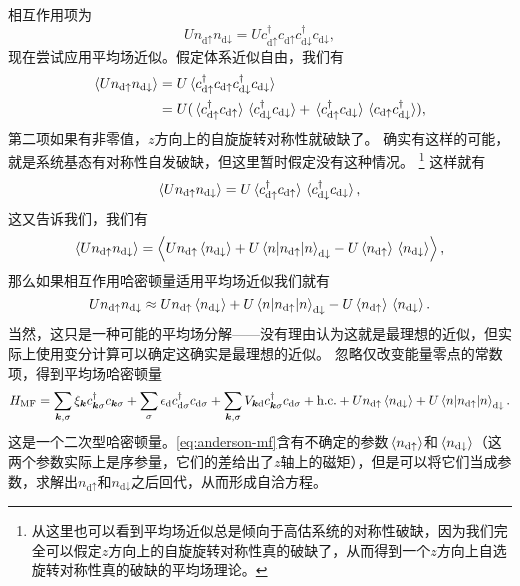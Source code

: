 相互作用项为
\[
    U {n}_{\text{d} \uparrow} {n}_{\text{d} \downarrow} = U {c}_{\text{d} \uparrow}^\dagger {c}_{\text{d} \uparrow} {c}^\dagger_{\text{d} \downarrow} {c}_{\text{d} \downarrow},
\]
现在尝试应用平均场近似。假定体系近似自由，我们有
\[
    \begin{aligned}
        \expval{U {n}_{\text{d} \uparrow} {n}_{\text{d} \downarrow}} &= U \expval*{{c}_{\text{d} \uparrow}^\dagger {c}_{\text{d} \uparrow} {c}^\dagger_{\text{d} \downarrow} {c}_{\text{d} \downarrow}} \\
        &= U ( \expval*{{c}_{\text{d} \uparrow}^\dagger {c}_{\text{d} \uparrow}} \expval*{{c}_{\text{d} \downarrow}^\dagger {c}_{\text{d} \downarrow}} + \expval*{{c}_{\text{d} \uparrow}^\dagger {c}_{\text{d} \downarrow}} \expval*{{c}_{\text{d} \uparrow} {c}^\dagger_{\text{d} \downarrow}} ),
    \end{aligned}
\]
第二项如果有非零值，$z$方向上的自旋旋转对称性就破缺了。
确实有这样的可能，就是系统基态有对称性自发破缺，但这里暂时假定没有这种情况。%
\footnote{从这里也可以看到平均场近似总是倾向于高估系统的对称性破缺，因为我们完全可以假定$z$方向上的自旋旋转对称性真的破缺了，从而得到一个$z$方向上自选旋转对称性真的破缺的平均场理论。
}%
这样就有
\[
    \expval{U {n}_{\text{d} \uparrow} {n}_{\text{d} \downarrow}} = U \expval*{{c}_{\text{d} \uparrow}^\dagger {c}_{\text{d} \uparrow}} \expval*{{c}_{\text{d} \downarrow}^\dagger {c}_{\text{d} \downarrow}},
\]
这又告诉我们，我们有
\[
    \expval{U {n}_{\text{d} \uparrow} {n}_{\text{d} \downarrow}} = \expval{ U {n}_{\text{d} \uparrow} \expval*{{n}_{\text{d} \downarrow}} + U \expval*{{n}_{\text{d} \uparrow}} {n}_{\text{d} \downarrow} - U \expval*{{n}_{\text{d} \uparrow}} \expval*{{n}_{\text{d} \downarrow}} },
\]
那么如果相互作用哈密顿量适用平均场近似我们就有
\begin{equation}
    U {n}_{\text{d} \uparrow} {n}_{\text{d} \downarrow} \approx U {n}_{\text{d} \uparrow} \expval*{{n}_{\text{d} \downarrow}} + U \expval*{{n}_{\text{d} \uparrow}} {n}_{\text{d} \downarrow} - U \expval*{{n}_{\text{d} \uparrow}} \expval*{{n}_{\text{d} \downarrow}}.
\end{equation}
当然，这只是一种可能的平均场分解——没有理由认为这就是最理想的近似，但实际上使用变分计算可以确定这确实是最理想的近似。
忽略仅改变能量零点的常数项，得到平均场哈密顿量
\begin{equation}
    {H}_\text{MF} = \sum_{\vb*{k}, \sigma} \xi_{\vb*{k}} {c}_{\vb*{k}\sigma}^\dagger {c}_{\vb*{k} \sigma} + \sum_\sigma \epsilon_\text{d} {c}_{\text{d}\sigma}^\dagger {c}_{\text{d} \sigma} + \sum_{\vb*{k}, \sigma} V_{\vb*{k} \text{d}} {c}_{\vb*{k} \sigma}^\dagger {c}_{\text{d} \sigma} + \text{h.c.} + U {n}_{\text{d} \uparrow} \expval*{{n}_{\text{d} \downarrow}} + U \expval*{{n}_{\text{d} \uparrow}} {n}_{\text{d} \downarrow}.
    \label{eq:anderson-mf}
\end{equation}
这是一个二次型哈密顿量。\eqref{eq:anderson-mf}含有不确定的参数$\expval*{{n}_{\text{d} \uparrow}}$和$\expval*{{n}_{\text{d} \downarrow}}$（这两个参数实际上是序参量，它们的差给出了$z$轴上的磁矩），但是可以将它们当成参数，求解出${n}_{\text{d} \uparrow}$和${n}_{\text{d} \downarrow}$之后回代，从而形成自洽方程。

